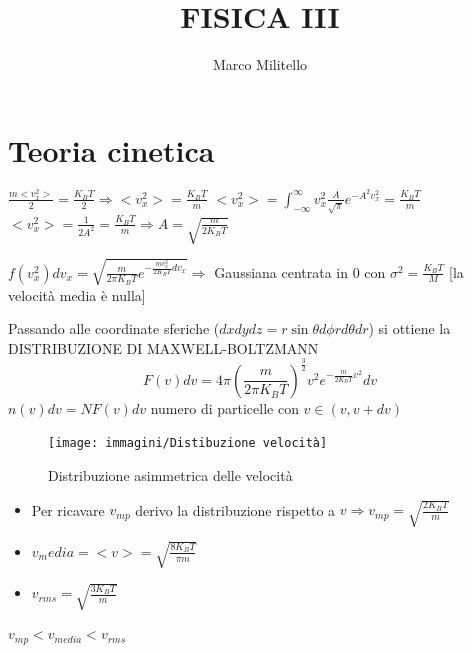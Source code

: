 \documentclass[a4paper,11pt]{report}
\begin{document}
	\date{}
	\author{Marco Militello}
	\title{FISICA III}
	\maketitle
	\tableofcontents
	\newpage
	\section{Teoria cinetica}
		$\frac{m<v_x^2>}{2}=\frac{K_BT}{2} \Rightarrow <v_x^2>= \frac{K_BT}{m}$ \newline
		$<v_x^2> = \int_{-\infty}^{\infty} v_x^2 \frac{A}{\sqrt{\pi}}e^{-A^2v_x^2} = \frac{K_BT}{m} $ \newline
		$<v_x^2> = \frac{1}{2A^2} = \frac{K_BT}{m} \Rightarrow A=\sqrt{\frac{m}{2K_BT}}$ 
		
		\noindent $f(v_x^2)dv_x = \sqrt{\frac{m}{2\pi K_BT} e^{-\frac{mv_x^2}{2K_BT}dv_x}} \Rightarrow$ Gaussiana centrata in 0 con $\sigma^2 = \frac{K_BT}{M}$ [la velocità media è nulla] 
		
		\noindent Passando alle coordinate sferiche ($dxdydz = r\sin\theta d\phi r d\theta dr$) si ottiene la DISTRIBUZIONE DI MAXWELL-BOLTZMANN
		$$
		F(v)dv = 4\pi {(\frac{m}{2\pi K_BT})}^{\frac{3}{2}} v^2 e^{-\frac{m}{2K_BT}v^2} dv
		$$
		$n(v)dv = NF(v)dv$ numero di particelle con $v \in (v,v+dv)$
		\begin{figure}[h]
			\centering
			\texttt{[image: immagini/Distibuzione velocità]}
			\caption{Distribuzione asimmetrica delle velocità}
			\label{fig:distibuzione-velocita}
		\end{figure}
	
		\begin{itemize}
			\item Per ricavare $v_{mp}$ derivo la distribuzione rispetto a $v \Rightarrow v_{mp} = \sqrt{\frac{2K_BT}{m}}$
			\item $v_media= <v> = \sqrt{\frac{8K_BT}{\pi m}}$
			\item $v_{rms} = \sqrt{\frac{3K_BT}{m}}$
		\end{itemize}
		$v_{mp} < v_{media} < v_{rms}$
		\newpage
\end{document}
